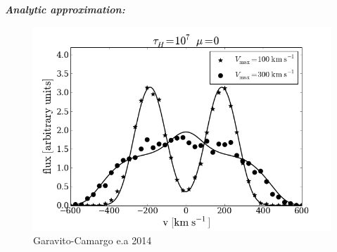 \documentclass{beamer}
\begin{document}
\begin{frame}{\textit{\textbf{Analytic approximation:}}}
\begin{figure}
\includegraphics[scale=0.4]{Figures/vary_vel1.png}
\caption*{Garavito-Camargo e.a 2014}
\end{figure}
\end{frame}
\end{document}
